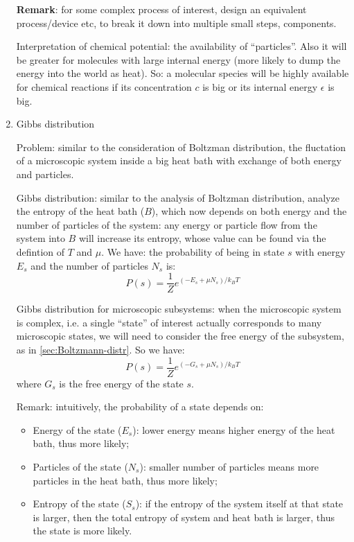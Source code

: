 \documentclass{report}
\begin{document}
\begin{enumerate}
\textbf{Remark}: for some complex process of interest, design an equivalent process/device etc, to break it down into multiple small steps, components. 

Interpretation of chemical potential: the availability of ``particles''. Also it will be greater for molecules with large internal energy (more likely to dump the energy into the world as heat). So: a molecular species will be highly available for chemical reactions if its concentration $c$ is big or its internal energy $\epsilon$ is big. 

\item{Gibbs distribution}

Problem: similar to the consideration of Boltzman distribution, the fluctation of a microscopic system inside a big heat bath with exchange of both energy and particles. 

Gibbs distribution: similar to the analysis of Boltzman distribution, analyze the entropy of the heat bath ($B$), which now depends on both energy and the number of particles of the system: any energy or particle flow from the system into $B$ will increase its entropy, whose value can be found via the defintion of $T$ and $\mu$. We have: the probability of being in state $s$ with energy $E_s$ and the number of particles $N_s$ is: 
\begin{equation}
P(s) = \frac{1}{Z} e^{(-E_s+\mu N_s)/k_B T}
\end{equation}

Gibbs distribution for microscopic subsystems: when the microscopic system is complex, i.e. a single ``state'' of interest actually corresponds to many microscopic states, we will need to consider the free energy of the subsystem, as in \ref{sec:Boltzmann-distr}. So we have: 
\begin{equation}
P(s) = \frac{1}{Z} e^{(-G_s+\mu N_s)/k_B T}
\end{equation}
where $G_s$ is the free energy of the state $s$. 

Remark: intuitively, the probability of a state depends on: 
\begin{itemize}
\item Energy of the state ($E_s$): lower energy means higher energy of the heat bath, thus more likely; 
\item Particles of the state ($N_s$): smaller number of particles means more particles in the heat bath, thus more likely;
\item Entropy of the state ($S_s$): if the entropy of the system itself at that state is larger, then the total entropy of system and heat bath is larger, thus the state is more likely. 
\end{itemize}


\end{enumerate}
\end{document}
